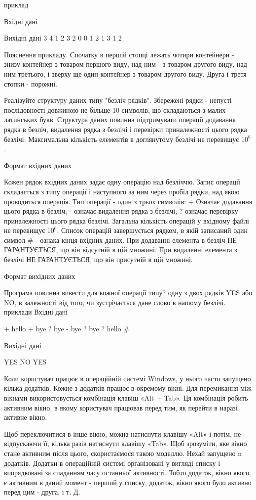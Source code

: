 \documentclass[]{article}
\begin{document}
приклад

Вхідні дані


Вихідні дані
3
4 1 2 3 2
0
0 1 2
1 3
1 2

Пояснення прикладу. Спочатку в першій стопці лежать чотири контейнери - знизу контейнер з товаром першого виду, над ним - з товаром другого виду, над ним третього, і зверху ще один контейнер з товаром другого виду. Друга і третя стопки - порожні.

Реалізуйте структуру даних типу "безліч рядків". Збережені рядки - непусті послідовності довжиною не більше 10 символів, що складаються з малих латинських букв.
Структура даних повинна підтримувати операції додавання рядка в безліч, видалення рядка з безлічі і перевірки приналежності цього рядка безлічі.
Максимальна кількість елементів в доглянутому безлічі не перевищує $10^6$.

Формат вхідних даних

Кожен рядок вхідних даних задає одну операцію над безліччю. Запис операції складається з типу операції і наступного за ним через пробіл рядки, над якою проводиться операція.
Тип операції - один з трьох символів:
    + Означає додавання цього рядка в безліч;
    - означає видалення рядка з безлічі;
    ? означає перевірку приналежності цього рядка безлічі.
Загальна кількість операцій у вхідному файлі не перевищує $10^6$. Список операцій завершується рядком, в якій записаний один символ 
\# - ознака кінця вхідних даних.
При додаванні елемента в безліч НЕ ГАРАНТУЄТЬСЯ, що він відсутній в цій множині. При видаленні елемента з безлічі НЕ ГАРАНТУЄТЬСЯ, що він присутній в цій множині.

Формат вихідних даних

Програма повинна вивести для кожної операції типу? одну з двох рядків YES або NO, в залежності від того, чи зустрічається дане слово в нашому безлічі.
приклади
Вхідні дані

+ hello
+ bye
? bye
- bye
? bye
? hello
\#

Вихідні дані

YES
NO
YES


Коли користувач працює в операційній системі Windows, у нього часто запущено кілька додатків. Кожне з додатків працює в окремому вікні. Для перемикання між вікнами використовується комбінація клавіш «Alt + Tab». Ця комбінація робить активним вікно, в якому користувач працював перед тим, як перейти в наразі активне вікно.

Щоб переключитися в інше вікно, можна натиснути клавішу «Alt» і потім, не відпускаючи її, кілька разів натиснути клавішу «Tab». Щоб зрозуміти, яке вікно стане активним після цього, скористаємося такою моделлю. Нехай запущено n додатків. Додатки в операційній системі організовані у вигляді списку і впорядковані за спаданням часу останньої активності. Тобто додаток, вікно якого є активним в даний момент - перший у списку, додаток, вікно якого було активно перед цим - друга, і т. Д.
\end{document}
